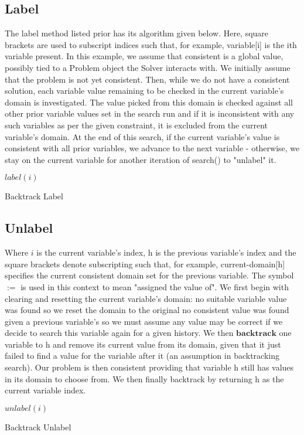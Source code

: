 \documentclass{article}
\begin{document}
\subsection*{Label}
The label method listed prior has its algorithm given below. Here, square brackets are used to subscript indices such that, for example, variable[i] is the ith variable present. In this example, we assume that consistent is a global value, possibly tied to a Problem object the Solver interacts with. We initially assume that the problem is not yet consistent. Then, while we do not have a consistent solution, each variable value remaining to be checked in the current variable's domain is investigated. The value picked from this domain is checked against all other prior variable values set in the search run and if it is inconsistent with any such variables as per the given constraint, it is excluded from the current variable's domain. At the end of this search, if the current variable's value is consistent with all prior variables, we advance to the next variable - otherwise, we stay on the current variable for another iteration of search() to "unlabel" it.
\begin{algorithm}[!htpb]
\DontPrintSemicolon
\nl $label(i)$\;
\nl {}
\caption{Backtrack Label}
\label{btLabel}
\end{algorithm}
\subsection*{Unlabel}
Where $i$ is the current variable's index, h is the previous variable's index and the square brackets denote subscripting such that, for example, current-domain[h] specifies the current consistent domain set for the previous variable. The symbol $:=$ is used in this context to mean "assigned the value of". We first begin with clearing and resetting the current variable's domain: no suitable variable value was found so we reset the domain to the original no consistent value was found given a previous variable's so we must assume any value may be correct if we decide to search this variable again for a given history. We then $\textbf{backtrack}$ one variable to h and remove its current value from its domain, given that it just failed to find a value for the variable after it (an assumption in backtracking search). Our problem is then consistent providing that variable h still has values in its domain to choose from. We then finally backtrack by returning h as the current variable index.
\begin{algorithm}
\DontPrintSemicolon
\nl $unlabel(i)$\;
\nl {}
\caption{Backtrack Unlabel}
\label{btUnlabel}
\end{algorithm}
\end{document}
